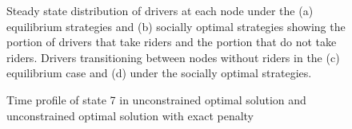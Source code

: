 \begin{figure}
\center
{} 
\caption{Steady state distribution of drivers at each node under the (a) equilibrium strategies and (b) socially optimal strategies showing the portion of drivers that take riders and the portion that do not take riders.   
Drivers transitioning between nodes without riders in the (c) equilibrium case and (d) under the socially optimal strategies. }
\label{fig:nodesinf}
\end{figure}
\begin{figure}
\center
{} 
\caption{Time profile of state 7 in unconstrained optimal solution and unconstrained optimal solution with exact penalty}
\label{fig:state7}
\end{figure}




